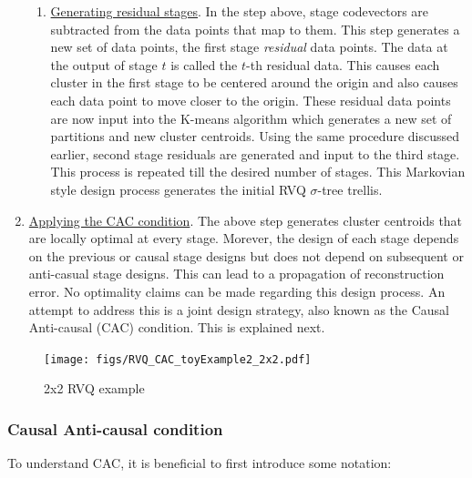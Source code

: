 \begin{enumerate}
\begin{enumerate}
\item \underline{Generating residual stages}.  In the step above, stage codevectors are subtracted from the data points that map to them.  This step generates a new set of data points, the first stage \emph{residual} data points.  The data at the output of stage $t$ is called the $t$-th residual data.  This causes each cluster in the first stage to be centered around the origin and also causes each data point to move closer to the origin.  These residual data points are now input into the K-means algorithm which generates a new set of partitions and new cluster centroids.  Using the same procedure discussed earlier, second stage residuals are generated and input to the third stage.  This process is repeated till the desired number of stages.  This Markovian style design process generates the initial RVQ $\sigma$-tree trellis.  
\end{enumerate}
\item \underline{Applying the CAC condition}.  The above step generates cluster centroids that are locally optimal at every stage.  Morever, the design of each stage depends on the previous or causal stage designs but does not depend on subsequent or anti-casual stage designs.   This can lead to a propagation of reconstruction error.  No optimality claims can be made regarding this design process.  An attempt to address this is a joint design strategy, also known as the Causal Anti-causal (CAC) condition.  This is explained next.
\end{enumerate}

\begin{figure}
\center
\texttt{[image: figs/RVQ\_CAC\_toyExample2\_2x2.pdf]}
\caption{2x2 RVQ example}
\label{fig:Figure1}
\end{figure}





\subsubsection{Causal Anti-causal condition}
To understand CAC, it is beneficial to first introduce some notation:

